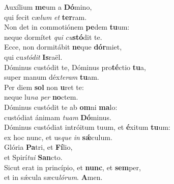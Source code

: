 \evenverse Auxílium \textbf{me}um a \textbf{Dó}mino,~\*\\
\evenverse qui fecit cæ\textit{lum} \textit{et} \textbf{ter}ram.\\
\oddverse Non det in commotiónem \textbf{pe}dem \textbf{tu}um:~\*\\
\oddverse neque dormítet \textit{qui} \textit{cu}\textbf{stó}dit te.\\
\evenverse Ecce, non dormitábit \textbf{ne}que \textbf{dór}miet,~\*\\
\evenverse qui cu\textit{stó}\textit{dit} \textbf{Is}raël.\\
\oddverse Dóminus custódit te, Dóminus pro\textbf{té}ctio \textbf{tu}a,~\*\\
\oddverse super manum déx\textit{te}\textit{ram} \textbf{tu}am.\\
\evenverse Per diem \textbf{sol} non \textbf{u}ret te:~\*\\
\evenverse neque lu\textit{na} \textit{per} \textbf{no}ctem.\\
\oddverse Dóminus custódit te ab \textbf{om}ni \textbf{ma}lo:~\*\\
\oddverse custódiat ánimam \textit{tu}\textit{am} \textbf{Dó}minus.\\
\evenverse Dóminus custódiat intróitum tuum, et \textbf{é}xitum \textbf{tu}um:~\*\\
\evenverse ex hoc nunc, et us\textit{que} \textit{in} \textbf{sǽ}culum.\\
\oddverse Glória \textbf{Pa}tri, et \textbf{Fí}lio,~\*\\
\oddverse et Spirí\textit{tu}\textit{i} \textbf{San}cto.\\
\evenverse Sicut erat in princípio, et \textbf{nunc}, et \textbf{sem}per,~\*\\
\evenverse et in sǽcula sæcu\textit{ló}\textit{rum}. \textbf{A}men.\\
